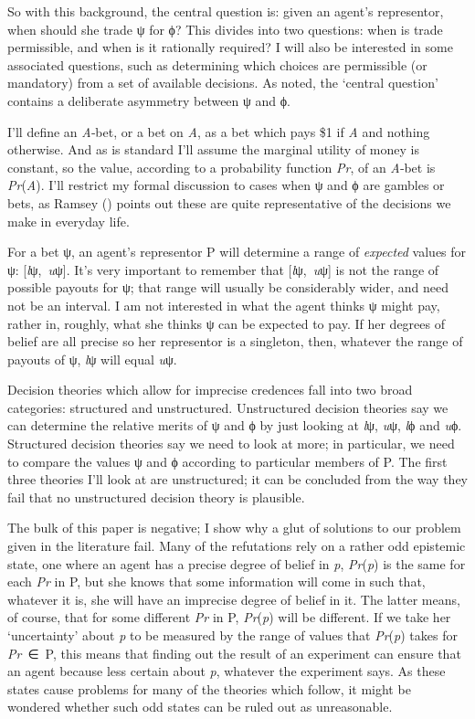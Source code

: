 \documentclass[
  11pt,
  letterpaper,
  DIV=11,
  numbers=noendperiod,
  twoside]{scrartcl}
\begin{document}
So with this background, the central question is: given an agent's
representor, when should she trade ψ for ϕ? This divides into two
questions: when is trade permissible, and when is it rationally
required? I will also be interested in some associated questions, such
as determining which choices are permissible (or mandatory) from a set
of available decisions. As noted, the `central question' contains a
deliberate asymmetry between ψ and ϕ.

I'll define an \emph{A}‑bet, or a bet on \emph{A}, as a bet which pays
\$1 if \emph{A} and nothing otherwise. And as is standard I'll assume
the marginal utility of money is constant, so the value, according to a
probability function \emph{Pr}, of an \emph{A}‑bet is
\emph{Pr}(\emph{A}). I'll restrict my formal discussion to cases when ψ
and ϕ are gambles or bets, as Ramsey
() points out these are quite
representative of the decisions we make in everyday life.

For a bet ψ, an agent's representor P will determine a range of
\emph{expected} values for ψ: {[}\emph{l}ψ,~\emph{u}ψ{]}. It's very
important to remember that {[}\emph{l}ψ,~\emph{u}ψ{]} is not the range
of possible payouts for ψ; that range will usually be considerably
wider, and need not be an interval. I am not interested in what the
agent thinks ψ might pay, rather in, roughly, what she thinks ψ can be
expected to pay. If her degrees of belief are all precise so her
representor is a singleton, then, whatever the range of payouts of ψ,
\emph{l}ψ will equal \emph{u}ψ.

Decision theories which allow for imprecise credences fall into two
broad categories: structured and unstructured. Unstructured decision
theories say we can determine the relative merits of ψ and ϕ by just
looking at \emph{l}ψ, \emph{u}ψ, \emph{l}ϕ and \emph{u}ϕ. Structured
decision theories say we need to look at more; in particular, we need to
compare the values ψ and ϕ according to particular members of P. The
first three theories I'll look at are unstructured; it can be concluded
from the way they fail that no unstructured decision theory is
plausible.

The bulk of this paper is negative; I show why a glut of solutions to
our problem given in the literature fail. Many of the refutations rely
on a rather odd epistemic state, one where an agent has a precise degree
of belief in \emph{p}, \emph{Pr}(\emph{p}) is the same for each
\emph{Pr} in P, but she knows that some information will come in such
that, whatever it is, she will have an imprecise degree of belief in it.
The latter means, of course, that for some different \emph{Pr} in P,
\emph{Pr}(\emph{p}) will be different. If we take her `uncertainty'
about \emph{p} to be measured by the range of values that
\emph{Pr}(\emph{p}) takes for \emph{Pr}~∈~P, this means that finding out
the result of an experiment can ensure that an agent because less
certain about \emph{p}, whatever the experiment says. As these states
cause problems for many of the theories which follow, it might be
wondered whether such odd states can be ruled out as unreasonable.
\end{document}
